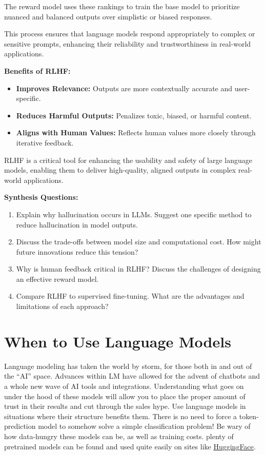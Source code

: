 The reward model uses these rankings to train the base model to prioritize nuanced and balanced outputs over simplistic or biased responses.

This process ensures that language models respond appropriately to complex or sensitive prompts, enhancing their reliability and trustworthiness in real-world applications. 

\textbf{Benefits of RLHF:}
\begin{itemize}
    \item \textbf{Improves Relevance:} Outputs are more contextually accurate and user-specific.
    \item \textbf{Reduces Harmful Outputs:} Penalizes toxic, biased, or harmful content.
    \item \textbf{Aligns with Human Values:} Reflects human values more closely through iterative feedback.
\end{itemize}

RLHF is a critical tool for enhancing the usability and safety of large language models, enabling them to deliver high-quality, aligned outputs in complex real-world applications.



\begin{questionbox}
\textbf{Synthesis Questions:}

\begin{enumerate}
    \item Explain why hallucination occurs in LLMs. Suggest one specific method to reduce hallucination in model outputs.
    \item Discuss the trade-offs between model size and computational cost. How might future innovations reduce this tension?
    \item Why is human feedback critical in RLHF? Discuss the challenges of designing an effective reward model.
    \item Compare RLHF to supervised fine-tuning. What are the advantages and limitations of each approach?
\end{enumerate}
\end{questionbox}

\section{When to Use Language Models}
    \large Language modeling has taken the world by storm, for those both in and out of the ``AI'' space. Advances within LM have allowed for the advent of chatbots and a whole new wave of AI tools and integrations. Understanding what goes on under the hood of these models will allow you to place the proper amount of trust in their results and cut through the sales hype. Use language models in situations where their structure benefits them. There is no need to force a token-prediction model to somehow solve a simple classification problem! Be wary of how data-hungry these models can be, as well as training costs. plenty of pretrained models can be found and used quite easily on sites like \href{https://huggingface.co/models}{HuggingFace}.


